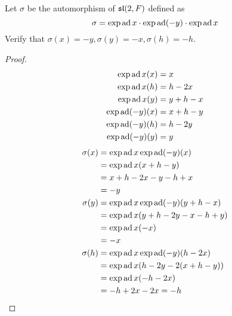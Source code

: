 \begin{ex}
  Let $\sigma$ be the automorphism of $\sl(2, F)$ defined as
  \begin{equation*}
    \sigma=\exp\ad x\cdot\exp\ad(-y)\cdot\exp\ad x
  \end{equation*}
  Verify that $\sigma(x) = -y, \sigma(y) = -x, \sigma(h) = -h$.
\end{ex}
\begin{proof}
  \begin{align*}
    \exp \ad x(x) &= x \\
    \exp \ad x(h) &= h - 2x \\
    \exp \ad x(y) &= y + h - x \\
    \exp \ad(-y)(x) &= x + h - y \\
    \exp \ad(-y)(h) &= h - 2y \\
    \exp \ad(-y)(y) &= y
  \end{align*}
  \begin{align*}
    \sigma(x) &= \exp \ad x \exp \ad (-y)(x) \\
    &= \exp \ad x(x + h - y) \\
    &= x + h - 2x - y - h + x \\
    &= -y \\
    \sigma(y) &= \exp \ad x \exp \ad (-y)(y + h - x) \\
    &= \exp \ad x(y + h - 2y - x - h + y) \\
    &= \exp \ad x(-x) \\
    &= -x \\
    \sigma(h) &= \exp \ad x \exp \ad (-y)(h - 2x) \\
    &= \exp \ad x(h - 2y - 2(x + h - y)) \\
    &= \exp \ad x(-h - 2x) \\
    &= -h + 2x - 2x = -h
  \end{align*}
\end{proof}

